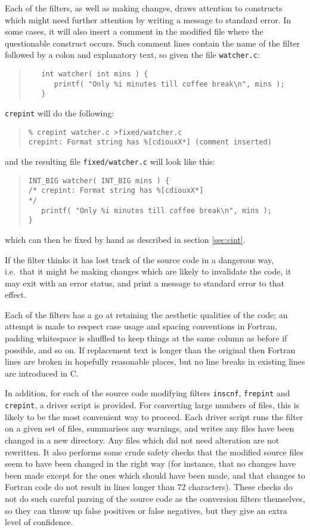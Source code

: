 \documentclass[twoside,11pt]{article}
\newcommand{\htmlref}[2]{#1}
\renewcommand{\_}{\texttt{\symbol{95}}}
\newcommand{\xroutine}[1]{\htmlref{{\tt #1}}{#1}}
\newcommand{\file}[1]{{\tt #1}}
\newenvironment{squote}{\begin{quote}\begin{small}}{\end{small}\end{quote}}
\begin{document}
Each of the filters, as well as making changes, 
draws attention to constructs which might need 
further attention by writing a message to standard error. 
In some cases, it will also insert a comment in the modified file where
the questionable construct occurs.
Such comment lines contain the name of the filter followed by a colon
and explanatory text, so given the file \file{watcher.c}:
\begin{squote}
\begin{verbatim}
   int watcher( int mins ) {
      printf( "Only %i minutes till coffee break\n", mins );
   }
\end{verbatim}
\end{squote}
\xroutine{crepint} will do the following:
\begin{squote}
\begin{verbatim}
% crepint watcher.c >fixed/watcher.c
crepint: Format string has %[cdiouxX*] (comment inserted)
\end{verbatim}
\end{squote}
and the resulting file \file{fixed/watcher.c} will look like this:
\begin{squote}
\begin{verbatim}
INT_BIG watcher( INT_BIG mins ) {
/* crepint: Format string has %[cdiouxX*]                                */
   printf( "Only %i minutes till coffee break\n", mins );
}
\end{verbatim}
\end{squote}
which can then be fixed by hand as described in
section \ref{sec:cint}.

If the filter thinks it has lost track of the source code in a dangerous
way, i.e.\ that it might be making changes which are likely to invalidate
the code, it may exit with an error status, and print a message to standard
error to that effect.

Each of the filters has a go at retaining the aesthetic 
qualities of the code; an attempt is made to respect 
case usage and spacing conventions in Fortran, 
padding whitespace is shuffled to keep things at the same column as
before if possible, and so on.
If replacement text is longer than the original
then Fortran lines are broken in hopefully reasonable places,
but no line breaks in existing lines are introduced in C.

In addition, for each of the source code modifying filters
\xroutine{inscnf}, \xroutine{frepint} and \xroutine{crepint}, 
a driver script is provided. 
For converting large numbers of files, this is likely to be the 
most convenient way to proceed.  Each driver script 
runs the filter on a given set of files, summarises any warnings, and
writes any files have been changed in a new directory.
Any files which did not need alteration are not rewritten.
It also performs some crude safety checks that the modified source
files seem to have been changed in the right way (for instance, that
no changes have been made except for the ones which should have been
made, and that changes to Fortran code do not result in lines longer
than 72 characters).  
These checks do not do such careful parsing
of the source code as the conversion filters themselves, 
so they can throw up false positives or false negatives, but they give 
an extra level of confidence.
\end{document}
